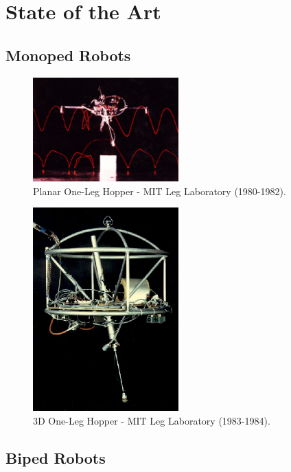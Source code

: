 \section{State of the Art}

\subsection{Monoped Robots}

\begin{figure}[H]
\centering
\includegraphics[width=0.5\textwidth]{images/literature/planar-one-leg-hopper.jpeg} 
\caption{Planar One-Leg Hopper - MIT Leg Laboratory (1980-1982).}
\label{fig:planar-one-leg-hopper}
\end{figure}

\begin{figure}[H]
\centering
\includegraphics[width=0.5\textwidth]{images/literature/3D-one-leg-hopper.jpeg} 
\caption{3D One-Leg Hopper - MIT Leg Laboratory (1983-1984).}
\label{fig:3D-one-leg-hopper}
\end{figure}


\subsection{Biped Robots}

